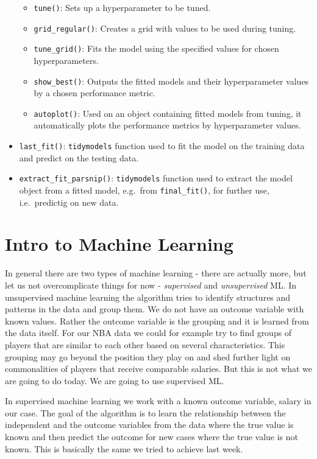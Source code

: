 \documentclass[
]{book}
\providecommand{\tightlist}{%
  \setlength{\itemsep}{0pt}\setlength{\parskip}{0pt}}
\begin{document}
\begin{itemize}
  \begin{itemize}
  \tightlist
  \item
    \texttt{tune()}: Sets up a hyperparameter to be tuned.
  \item
    \texttt{grid\_regular()}: Creates a grid with values to be used during tuning.
  \item
    \texttt{tune\_grid()}: Fits the model using the specified values for chosen hyperparameters.
  \item
    \texttt{show\_best()}: Outputs the fitted models and their hyperparameter values by a chosen performance metric.
  \item
    \texttt{autoplot()}: Used on an object containing fitted models from tuning, it automatically plots the performance metrics by hyperparameter values.
  \end{itemize}
\item
  \texttt{last\_fit()}: \texttt{tidymodels} function used to fit the model on the training data and predict on the testing data.
\item
  \texttt{extract\_fit\_parsnip()}: \texttt{tidymodels} function used to extract the model object from a fitted model, e.g.~from \texttt{final\_fit()}, for further use, i.e.~predictig on new data.
\end{itemize}

\hypertarget{intro-to-machine-learning}{%
\section{Intro to Machine Learning}\label{intro-to-machine-learning}}

In general there are two types of machine learning - there are actually more,
but let us not overcomplicate things for now - \emph{supervised} and \emph{unsupervised}
ML. In unsupervised machine learning the algorithm tries to identify structures
and patterns in the data and group them. We do not have an outcome variable
with known values. Rather the outcome variable is the grouping and it is
learned from the data itself. For our NBA data we could for example
try to find groups of players that are similar to each other based on several
characteristics. This grouping may go beyond the position they play on and shed
further light on commonalities of players that receive comparable salaries. But
this is not what we are going to do today. We are going to use supervised ML.

In supervised machine learning we work with a known outcome variable, salary in
our case. The goal of the algorithm is to learn the relationship between the
independent and the outcome variables from the data where the true value is
known and then predict the outcome for new cases where the true value is not
known. This is basically the same we tried to achieve last week.
\end{document}
